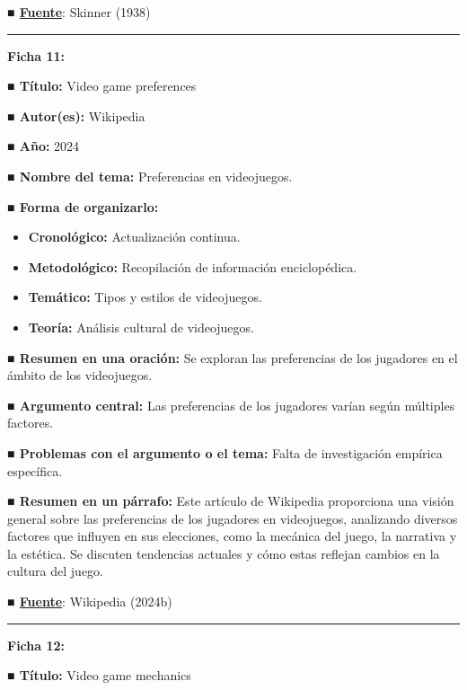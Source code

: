 \documentclass[
  letterpaper,
  DIV=11,
  numbers=noendperiod]{scrreprt}
\begin{document}
\textbf{■
\href{https://books.google.com/books/about/The_Behavior_of_Organisms.html?id=S9WNCwAAQBAJ}{Fuente}}:
Skinner (1938)

\begin{center}\rule{0.5\linewidth}{0.5pt}\end{center}

\textbf{Ficha 11:}

\textbf{■ Título:} Video game preferences

\textbf{■ Autor(es):} Wikipedia

\textbf{■ Año:} 2024

\textbf{■ Nombre del tema:} Preferencias en videojuegos.

\textbf{■ Forma de organizarlo:}

\begin{itemize}
\item
  \textbf{Cronológico:} Actualización continua.
\item
  \textbf{Metodológico:} Recopilación de información enciclopédica.
\item
  \textbf{Temático:} Tipos y estilos de videojuegos.
\item
  \textbf{Teoría:} Análisis cultural de videojuegos.
\end{itemize}

\textbf{■ Resumen en una oración:} Se exploran las preferencias de los
jugadores en el ámbito de los videojuegos.

\textbf{■ Argumento central:} Las preferencias de los jugadores varían
según múltiples factores.

\textbf{■ Problemas con el argumento o el tema:} Falta de investigación
empírica específica.

\textbf{■ Resumen en un párrafo:} Este artículo de Wikipedia proporciona
una visión general sobre las preferencias de los jugadores en
videojuegos, analizando diversos factores que influyen en sus
elecciones, como la mecánica del juego, la narrativa y la estética. Se
discuten tendencias actuales y cómo estas reflejan cambios en la cultura
del juego.

\textbf{■
\href{https://en.wikipedia.org/wiki/Video_game_preferences}{Fuente}}:
Wikipedia (2024b)

\begin{center}\rule{0.5\linewidth}{0.5pt}\end{center}

\textbf{Ficha 12:}

\textbf{■ Título:} Video game mechanics
\end{document}
